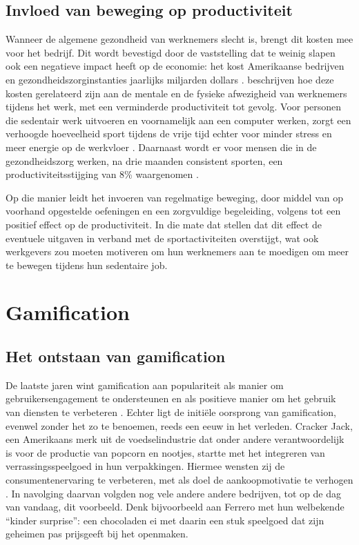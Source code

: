 \subsection{Invloed van beweging op productiviteit}
Wanneer de algemene gezondheid van werknemers slecht is, brengt dit kosten mee voor het bedrijf. Dit wordt bevestigd door de vaststelling dat te weinig slapen ook een negatieve impact heeft op de economie: het kost Amerikaanse bedrijven en gezondheidszorginstanties jaarlijks miljarden dollars \autocite{Dolezal2017}. \textcite{Sjoegaard2016} beschrijven hoe deze kosten gerelateerd zijn aan de mentale en de fysieke afwezigheid van werknemers tijdens het werk, met een verminderde productiviteit tot gevolg. Voor personen die sedentair werk uitvoeren en voornamelijk aan een computer werken, zorgt een verhoogde hoeveelheid sport tijdens de vrije tijd echter voor minder stress en meer energie op de werkvloer \autocite{Hansen2009}. Daarnaast wordt er voor mensen die in de gezondheidszorg werken, na drie maanden consistent sporten, een productiviteitsstijging van 8\% waargenomen \autocite{Sjoegaard2016}.

Op die manier leidt het invoeren van regelmatige beweging, door middel van op voorhand opgestelde oefeningen en een zorgvuldige begeleiding, volgens \textcite{Cancelliere2011} tot een positief effect op de productiviteit. In die mate dat \textcite{Sjoegaard2016} stellen dat dit effect de eventuele uitgaven in verband met de sportactiviteiten overstijgt, wat ook werkgevers zou moeten motiveren om hun werknemers aan te moedigen om meer te bewegen tijdens hun sedentaire job.

\section{Gamification}

\subsection{Het ontstaan van gamification}
De laatste jaren wint gamification aan populariteit als manier om gebruikersengagement
te ondersteunen en als positieve manier om het gebruik van diensten te
verbeteren \autocite{Hamari2013a}. Echter ligt de initiële oorsprong van gamification, evenwel zonder het zo te benoemen, reeds een eeuw in het verleden. Cracker Jack, een Amerikaans merk uit de voedselindustrie dat onder andere verantwoordelijk is voor de productie van popcorn en nootjes, startte met het integreren van verrassingsspeelgoed in hun verpakkingen. Hiermee wensten zij de consumentenervaring te verbeteren, met als doel de aankoopmotivatie te verhogen \autocite{Khaitova2021}. In navolging daarvan volgden nog vele andere andere bedrijven, tot op de dag van vandaag, dit voorbeeld. Denk bijvoorbeeld aan Ferrero met hun welbekende “kinder surprise”: een chocoladen ei met daarin een stuk speelgoed dat zijn geheimen pas prijsgeeft bij het openmaken.

